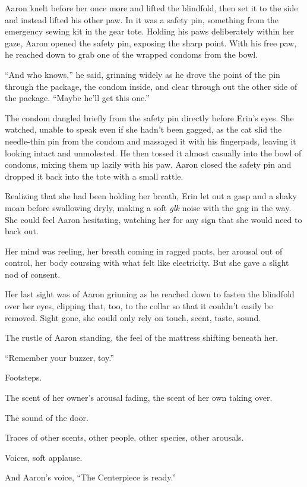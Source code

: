 \documentclass[12pt,letterpaper,oneside]{memoir}
\begin{document}
  Aaron knelt before her once more and lifted the blindfold, then set it to the side and instead lifted his other paw. In it was a safety pin, something from the emergency sewing kit in the gear tote. Holding his paws deliberately within her gaze, Aaron opened the safety pin, exposing the sharp point. With his free paw, he reached down to grab one of the wrapped condoms from the bowl.

  ``And who knows,'' he said, grinning widely as he drove the point of the pin through the package, the condom inside, and clear through out the other side of the package. ``Maybe he'll get this one.''

  The condom dangled briefly from the safety pin directly before Erin's eyes. She watched, unable to speak even if she hadn't been gagged, as the cat slid the needle-thin pin from the condom and massaged it with his fingerpads, leaving it looking intact and unmolested. He then tossed it almost casually into the bowl of condoms, mixing them up lazily with his paw. Aaron closed the safety pin and dropped it back into the tote with a small rattle.

  Realizing that she had been holding her breath, Erin let out a gasp and a shaky moan before swallowing dryly, making a soft \textit{glk} noise with the gag in the way. She could feel Aaron hesitating, watching her for any sign that she would need to back out.

  Her mind was reeling, her breath coming in ragged pants, her arousal out of control, her body coursing with what felt like electricity. But she gave a slight nod of consent.

  Her last sight was of Aaron grinning as he reached down to fasten the blindfold over her eyes, clipping that, too, to the collar so that it couldn't easily be removed. Sight gone, she could only rely on touch, scent, taste, sound.

  The rustle of Aaron standing, the feel of the mattress shifting beneath her.

  ``Remember your buzzer, toy.''

  Footsteps.

  The scent of her owner's arousal fading, the scent of her own taking over.

  The sound of the door.

  Traces of other scents, other people, other species, other arousals.

  Voices, soft applause.

  And Aaron's voice, ``The Centerpiece is ready.''
\end{document}
